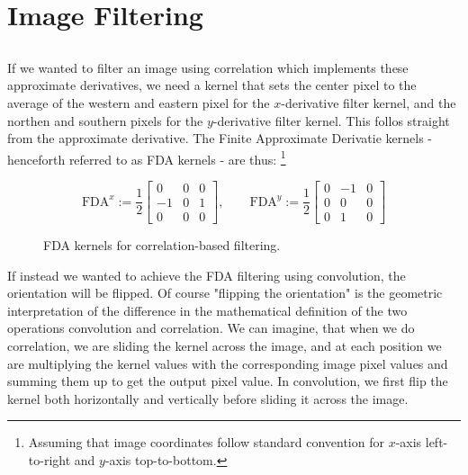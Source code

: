 \section{Image Filtering}


\subsection{}

If we wanted to filter an image using correlation which implements these approximate derivatives,
we need a kernel that sets the center pixel to the average of the western and eastern pixel for the $x$-derivative filter kernel,
and the northen and southern pixels for the $y$-derivative filter kernel.
This follos straight from the approximate derivative.
The Finite Approximate Derivatie kernels - henceforth referred to as FDA kernels - are thus:
\footnote{
	Assuming that image coordinates follow standard convention for $x$-axis left-to-right and $y$-axis top-to-bottom.
}
\begin{figure}[H]
	\begin{equation}
		\text{FDA}^x:=
		\frac{1}{2}
		\begin{bmatrix}
			0 & 0 & 0 \\	
			-1 & 0 & 1 \\
			0 & 0 & 0
		\end{bmatrix},
		\qquad
		\text{FDA}^y:=
		\frac{1}{2}
		\begin{bmatrix}
			0 & -1 & 0 \\	
			0 & 0 & 0 \\
			0 & 1 & 0
		\end{bmatrix}
	\end{equation}
	\caption{FDA kernels for correlation-based filtering.}
\end{figure}



If instead we wanted to achieve the FDA filtering using convolution, the orientation will be flipped.
Of course "flipping the orientation" is the geometric interpretation of the difference in the mathematical definition of the two operations convolution and correlation.
We can imagine, that when we do correlation, we are sliding the kernel across the image, and at each position we are multiplying the kernel values with the corresponding image pixel values and summing them up to get the output pixel value.
In convolution, we first flip the kernel both horizontally and vertically before sliding it across the image.

